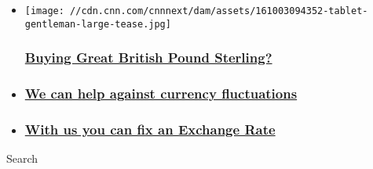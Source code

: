 \begin{itemize}
\item
  \href{https://cnnmoneytransfers.com/?utm_source=cnni\&utm_medium=belowfoldpz\&utm_term=pz3\&utm_campaign=campaign2}{}

  \texttt{[image: //cdn.cnn.com/cnnnext/dam/assets/161003094352-tablet-gentleman-large-tease.jpg]}

  \hypertarget{buying-great-british-pound-sterling}{%
  \subsubsection{\texorpdfstring{\href{https://cnnmoneytransfers.com/?utm_source=cnni\&utm_medium=belowfoldpz\&utm_term=pz3\&utm_campaign=campaign2}{Buying
  Great British Pound
  Sterling?}}{Buying Great British Pound Sterling?}}\label{buying-great-british-pound-sterling}}
\item
  \hypertarget{we-can-help-against-currency-fluctuations}{%
  \subsubsection{\texorpdfstring{\href{https://cnnmoneytransfers.com/our-services/?utm_source=cnni\&utm_medium=belowfoldpz\&utm_term=pz3\&utm_campaign=campaign3}{We
  can help against currency
  fluctuations}}{We can help against currency fluctuations}}\label{we-can-help-against-currency-fluctuations}}
\item
  \hypertarget{with-us-you-can-fix-an-exchange-rate}{%
  \subsubsection{\texorpdfstring{\href{https://cnnmoneytransfers.com/our-services/?utm_source=cnni\&utm_medium=belowfoldpz\&utm_term=pz3\&utm_campaign=campaign4}{With
  us you can fix an Exchange
  Rate}}{With us you can fix an Exchange Rate}}\label{with-us-you-can-fix-an-exchange-rate}}
\end{itemize}

Search

